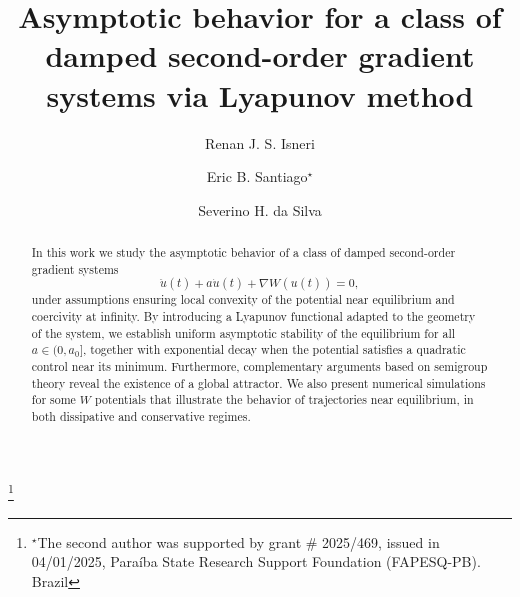 \documentclass[12pt]{amsart}
\numberwithin{equation}{section}
\begin{document}
	
	\title [Asymptotic behavior of damped second-order gradient systems]{Asymptotic behavior for a class of damped second-order gradient systems via Lyapunov method}
	
	\author{Renan J. S. Isneri}
	\author{Eric B. Santiago$^\star$}
	\author{Severino H. da Silva}
	
	\address[Renan J. S. Isneri]
	{\newline\indent Unidade Acad\^emica de Matem\'atica
		\newline\indent 
		Universidade Federal de Campina Grande,
		\newline{}-970, Campina Grande - PB - Brazil}
	
	\address[Eric B. Santiago]
	{\newline\indent Unidade Acad\^emica de Matem\'atica
		\newline\indent 
		Universidade Federal de Campina Grande,
		\newline{}-970, Campina Grande - PB - Brazil}
	
	\address[Severino H. da Silva]
	{\newline\indent Unidade Acad\^emica de Matem\'atica
		\newline\indent 
		Universidade Federal de Campina Grande,
		\newline{}-970, Campina Grande - PB - Brazil}
	
	
	\begin{abstract}
		\noindent In this work we study the asymptotic behavior of a class of damped second-order gradient systems
		$$
		\ddot{u}(t) + a\dot{u}(t) + \nabla W(u(t)) = 0,
		$$
		under assumptions ensuring local convexity of the potential near equilibrium and coercivity at infinity. By introducing a Lyapunov functional adapted to the geometry of the system, we establish uniform asymptotic stability of the equilibrium for all $a \in (0,a_0]$, together with exponential decay when the potential satisfies a quadratic control near its minimum. Furthermore, complementary arguments based on semigroup theory reveal the existence of a global attractor. We also present numerical simulations for some $W$ potentials that illustrate the behavior of trajectories near equilibrium, in both dissipative and conservative regimes.
	\end{abstract}
	\thanks{$^\star$The second author was supported by grant \# 2025/469, issued in 04/01/2025, Paraíba State Research Support Foundation (FAPESQ-PB). Brazil}
	
\end{document}
